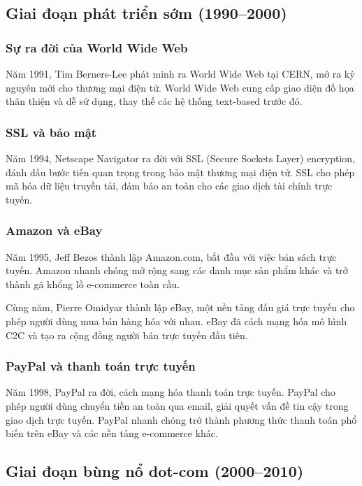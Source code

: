\documentclass[a4paper,12pt]{report}
\begin{document}
\subsection{Giai đoạn phát triển sớm (1990--2000)}

\subsubsection{Sự ra đời của World Wide Web}
Năm 1991, Tim Berners-Lee phát minh ra World Wide Web tại CERN, mở ra kỷ nguyên mới cho thương mại điện tử. World Wide Web cung cấp giao diện đồ họa thân thiện và dễ sử dụng, thay thế các hệ thống text-based trước đó.

\subsubsection{SSL và bảo mật}
Năm 1994, Netscape Navigator ra đời với SSL (Secure Sockets Layer) encryption, đánh dấu bước tiến quan trọng trong bảo mật thương mại điện tử. SSL cho phép mã hóa dữ liệu truyền tải, đảm bảo an toàn cho các giao dịch tài chính trực tuyến.

\subsubsection{Amazon và eBay}
Năm 1995, Jeff Bezos thành lập Amazon.com, bắt đầu với việc bán sách trực tuyến. Amazon nhanh chóng mở rộng sang các danh mục sản phẩm khác và trở thành gã khổng lồ e-commerce toàn cầu.

Cùng năm, Pierre Omidyar thành lập eBay, một nền tảng đấu giá trực tuyến cho phép người dùng mua bán hàng hóa với nhau. eBay đã cách mạng hóa mô hình C2C và tạo ra cộng đồng người bán trực tuyến đầu tiên.

\subsubsection{PayPal và thanh toán trực tuyến}
Năm 1998, PayPal ra đời, cách mạng hóa thanh toán trực tuyến. PayPal cho phép người dùng chuyển tiền an toàn qua email, giải quyết vấn đề tin cậy trong giao dịch trực tuyến. PayPal nhanh chóng trở thành phương thức thanh toán phổ biến trên eBay và các nền tảng e-commerce khác.

\subsection{Giai đoạn bùng nổ dot-com (2000--2010)}
\end{document}
